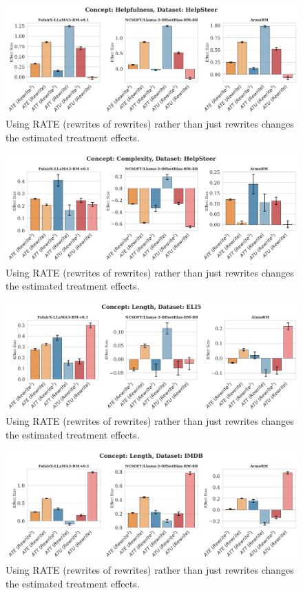 \documentclass{article}
\begin{document}
\begin{figure}[H]
  \centering
  \includegraphics[width=\linewidth]{figures/comp1.png}
  \caption{Using RATE (rewrites of rewrites) rather than just rewrites changes the estimated treatment effects.}
  \label{fig:Helpfulness-Helpsteer}
\end{figure}
\begin{figure}[H]
  \centering
  \includegraphics[width=\linewidth]{figures/comp2.png}
  \caption{Using RATE (rewrites of rewrites) rather than just rewrites changes the estimated treatment effects.}
  \label{fig:Complexity-Helpsteer}
\end{figure}
\begin{figure}[H]
  \centering
  \includegraphics[width=\linewidth]{figures/comp3.png}
  \caption{Using RATE (rewrites of rewrites) rather than just rewrites changes the estimated treatment effects.}
  \label{fig:Length-ELI5}
\end{figure}
\begin{figure}[H]
  \centering
  \includegraphics[width=\linewidth]{figures/comp4.png}
  \caption{Using RATE (rewrites of rewrites) rather than just rewrites changes the estimated treatment effects.}
  \label{fig:Length-IMDB}
\end{figure}
\end{document}
